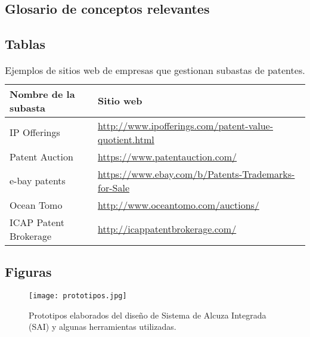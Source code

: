 \subsection{Glosario de conceptos relevantes }
\label{glosario}


\newpage
\subsection{Tablas}
\begin{table}[hb]
\centering
\begin{tabular}{|l|l|}
\hline
\rowcolor[HTML]{DDEBF7}
Nombre de la subasta  & Sitio web                                                                    \\ \hline
IP Offerings          & \url{http://www.ipofferings.com/patent-value-quotient.html}                \\ \hline
Patent Auction        & \url{https://www.patentauction.com/}                                       \\ \hline
e-bay patents         & \url{https://www.ebay.com/b/Patents-Trademarks-for-Sale} \\ \hline
Ocean Tomo            & \url{http://www.oceantomo.com/auctions/}                                   \\ \hline
ICAP Patent Brokerage & \url{http://icappatentbrokerage.com/}                                      \\ \hline
\end{tabular}
\caption{Ejemplos de sitios web de empresas que gestionan subastas de patentes.}
\label{sitios_de_subastas}
\end{table}
\newpage
\subsection{Figuras}
\label{anexo:figuras}
\begin{figure}[hb]
  \centering
  \texttt{[image: prototipos.jpg]}
  \caption{Prototipos elaborados del diseño de Sistema de Alcuza Integrada (SAI) y algunas herramientas utilizadas.}
  \label{foto_prototipos}
\end{figure}

